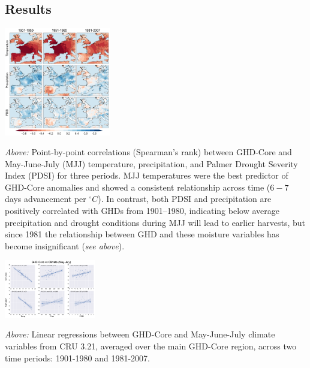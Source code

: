 \documentclass[portrait,a0,final] {a0poster} %
\begin{document}
\begin{multicols}{2}
\section*{Results}
\begin{center}
\includegraphics[width=0.35\textwidth]{../MANUSCRIPT/fig_02_core_cru_MJJ.png}
\end{center}
\vspace{1ex}
\emph{Above:} Point-by-point correlations (Spearman's rank) between GHD-Core and May-June-July (MJJ) temperature, precipitation, and Palmer Drought Severity Index (PDSI) for three periods. MJJ temperatures were the best predictor of GHD-Core anomalies and showed a consistent relationship across time ($6-7$ days advancement per $^{\circ}C$). In contrast, both PDSI and precipitation are positively correlated with GHDs from 1901--1980, indicating below average precipitation and drought conditions during MJJ will lead to earlier harvests, but since 1981 the relationship between GHD and these moisture variables has become insignificant (\emph{see above}). 
\begin{center}
\includegraphics[width=0.3\textwidth]{../MANUSCRIPT/fig_03_MJJ_clim_regplots.png}
\end{center}
\vspace{1ex}
\emph{Above:} Linear regressions between GHD-Core and May-June-July climate variables from CRU 3.21, averaged over the main GHD-Core region, across two time periods: 1901-1980 and 1981-2007.\\


\end{multicols}
\end{document}
